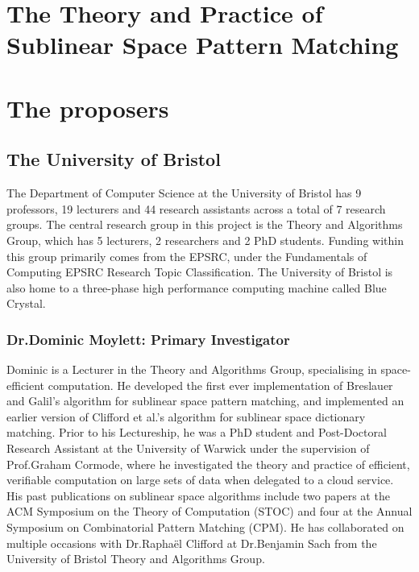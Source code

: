\documentclass[a4paper,11pt]{article}
\begin{document}
    \section*{The Theory and Practice of Sublinear Space Pattern Matching}

    \section*{The proposers}

    \subsection*{The University of Bristol}

    The Department of Computer Science at the University of Bristol has 9 professors, 19 lecturers and 44 research assistants across a total of 7 research groups. The central research group in this project is the Theory and Algorithms Group, which has 5 lecturers, 2 researchers and 2 PhD students. Funding within this group primarily comes from the EPSRC, under the Fundamentals of Computing EPSRC Research Topic Classification. The University of Bristol is also home to a three-phase high performance computing machine called Blue Crystal.

    \subsubsection*{Dr.\@ Dominic Moylett: Primary Investigator}

    Dominic is a Lecturer in the Theory and Algorithms Group, specialising in space-efficient computation. He developed the first ever implementation of Breslauer and Galil's algorithm for sublinear space pattern matching, and implemented an earlier version of Clifford et al.'s algorithm for sublinear space dictionary matching. Prior to his Lectureship, he was a PhD student and Post-Doctoral Research Assistant at the University of Warwick under the supervision of Prof.\@ Graham Cormode, where he investigated the theory and practice of efficient, verifiable computation on large sets of data when delegated to a cloud service. His past publications on sublinear space algorithms include two papers at the ACM Symposium on the Theory of Computation (STOC) and four at the Annual Symposium on Combinatorial Pattern Matching (CPM). He has collaborated on multiple occasions with Dr.\@ Rapha\"{e}l Clifford at Dr.\@ Benjamin Sach from the University of Bristol Theory and Algorithms Group.
\end{document}
